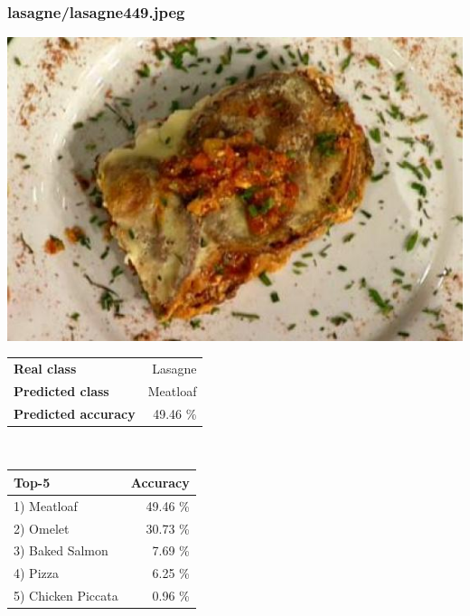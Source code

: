 \subsubsection{lasagne/lasagne449.jpeg}

\begin{minipage}[t]{0.4\textwidth}
	\vspace{0pt}
	\includegraphics[width=\linewidth]{images/evaluation-images/lasagne/lasagne449.jpeg}
\end{minipage}
\hfill
\begin{minipage}[t]{0.5\textwidth}
	\vspace{0pt}\raggedright
	\begin{tabularx}{\textwidth}{X r}
		\small \textbf{Real class} & \small Lasagne\\
		\small \textbf{Predicted class} & \small Meatloaf\\
		\small \textbf{Predicted accuracy} & \small 49.46 \%
    \end{tabularx}\\
    
    \vspace{6pt}
	\begin{tabularx}{\textwidth}{X r}
        \small \textbf{Top-5} & \small \textbf{Accuracy} \\
        \hline
		\small 1) Meatloaf & \small 49.46 \%\\\small 2) Omelet & \small 30.73 \%\\\small 3) Baked Salmon & \small 7.69 \%\\\small 4) Pizza & \small 6.25 \%\\\small 5) Chicken Piccata & \small 0.96 \%
    \end{tabularx}
\end{minipage}
    

